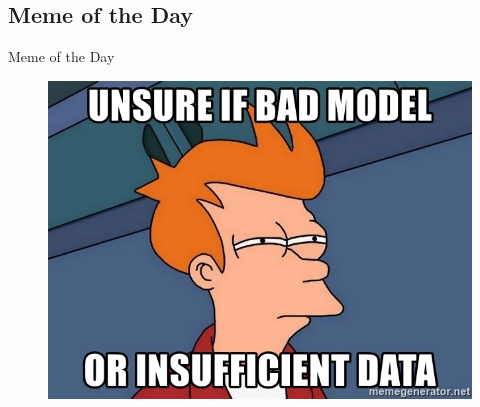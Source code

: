 \subsection{Meme of the Day}

\begin{frame}{Meme of the Day}{}
	\begin{figure}
		\includegraphics[scale=0.4]{09_evaluation/02_img/meme_of_the_day}
	\end{figure}
\end{frame}


\makethanks

